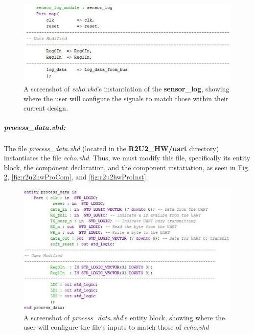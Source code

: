 \begin{figure}[H]
	\begin{center}
	\includegraphics[scale=0.5]{fig/r2u2_hw_echo_inst.pdf}
	\caption{A screenshot of \textit{echo.vhd}'s instantiation of the \textbf{sensor\_log}, showing where the user will configure the signals to match those within their current design.
	\label{fig:r2u2hwEchoInst}} 
	\end{center}
\end{figure}

\subparagraph{process\_data.vhd:} The file \textit{process\_data.vhd} (located in the \textbf{R2U2\_HW/uart} directory) instantiates the file \textit{echo.vhd}. Thus, we must modify this file, specifically its entity block, the component declaration, and the component instatiation, as seen in Fig. \ref{fig:r2u2hwProEnt}, \ref{fig:r2u2hwProCom}, and \ref{fig:r2u2hwProInst}.

\begin{figure}[H]
	\begin{center}
	\includegraphics[scale=0.5]{fig/r2u2_hw_process_entity.pdf}
	\caption{A screenshot of \textit{process\_data.vhd}'s entity block, showing where the user will configure the file's inputs to match those of \textit{echo.vhd}
	\label{fig:r2u2hwProEnt}} 
	\end{center}
\end{figure}


